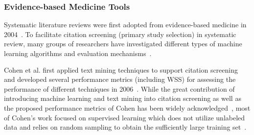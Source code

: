 \documentclass{svjour3}
\theoremstyle{break}
\begin{document}


\subsubsection{Evidence-based Medicine Tools}
\label{sect: Evidence-based Medicine}

Systematic literature reviews were first adopted from evidence-based medicine in
2004~\cite{kitchenham2004evidence}. To facilitate citation screening (primary
study selection) in systematic review, many groups of researchers have investigated different types of machine learning algorithms and evaluation mechanisms~\cite{o2015using,paynter2016epc}. 

Cohen et al. first applied text mining techniques to support citation screening and developed several performance metrics (including WSS) for assessing the performance of different techniques in 2006~\cite{cohen2006reducing}. While the great contribution of introducing machine learning and text mining into citation screening as well as the proposed performance metrics of Cohen has been widely acknowledged~\cite{o2015using}, most of Cohen's work focused on supervised learning which does not utilize unlabeled data and relies on random sampling to obtain the sufficiently large training set~\cite{cohen2006reducing,cohen2006effective,cohen2010prospective,cohen2011performance}.
\end{document}
